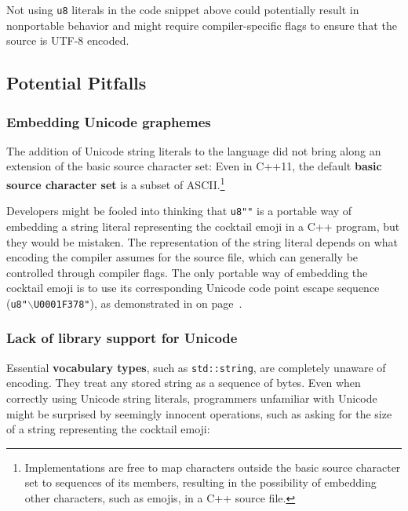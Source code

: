 \noindent Not using \texttt{u8} literals in the code snippet above could potentially result in
nonportable behavior and might require compiler-specific flags to
ensure that the source is UTF-8 encoded.

\subsection[Potential Pitfalls]{Potential Pitfalls}\label{potential-pitfalls}

\subsubsection[Embedding Unicode graphemes]{Embedding Unicode graphemes}\label{embedding-unicode-graphemes}

The addition of Unicode string literals to the language did not bring
along an extension of the basic source character set: Even in C++11, the
default \textbf{basic source character set} is a subset of
ASCII.{\cprotect\footnote{Implementations are free to map characters
outside the basic source character set to sequences of its members,
resulting in the possibility of embedding other characters, such as emojis, in a C++ source file.}}

Developers might be fooled into thinking that \texttt{u8"\martini"} is a
portable way of embedding a string literal representing the cocktail
emoji in a C++ program, but they would be mistaken. The representation of the string literal depends on what
encoding the compiler assumes for the source file, which can generally
be controlled through compiler flags. The only portable way of embedding
the cocktail emoji is to use its corresponding Unicode code point escape
sequence (\texttt{u8"$\backslash$U0001F378"}), as demonstrated in
\textit{} on page~\pageref{description-unicodestring}.

\subsubsection[Lack of library support for Unicode]{Lack of library support for Unicode}\label{lack-of-library-support-for-unicode}

Essential \textbf{vocabulary types}, such as \texttt{std::string}, are
completely unaware of encoding. They treat any stored string as a
sequence of bytes. Even when correctly using Unicode string literals,
programmers unfamiliar with Unicode might be surprised by seemingly
innocent operations, such as asking for the size of a string
representing the cocktail emoji:


